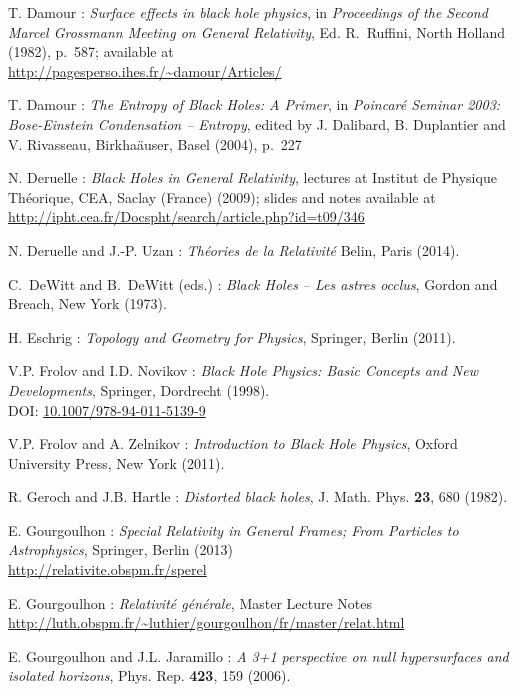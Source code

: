 \begin{thebibliography}{123}
T. Damour : {\em Surface effects in black hole physics},
in {\em Proceedings of the Second Marcel Grossmann Meeting on General
Relativity}, Ed. R.~Ruffini, North Holland (1982), p.~587; available at\\
\url{http://pagesperso.ihes.fr/~damour/Articles/}

T. Damour : {\em The Entropy of Black Holes: A Primer},
in {\em Poincaré Seminar 2003: Bose-Einstein Condensation -- Entropy},
edited by J. Dalibard, B. Duplantier and V. Rivasseau, Birkha\"auser, Basel (2004),
p.~227

N. Deruelle : {\em Black Holes in General Relativity}, lectures at
Institut de Physique Théorique, CEA, Saclay (France) (2009); slides and notes
available at \\
\url{http://ipht.cea.fr/Docspht/search/article.php?id=t09/346}

N. Deruelle and J.-P. Uzan : {\em Th\'eories de la Relativit\'e}
Belin, Paris (2014).

C.~DeWitt and B.~DeWitt (eds.) :
{\em Black Holes -- Les astres occlus},
Gordon and Breach, New York (1973).

H. Eschrig : {\em Topology and Geometry for Physics},
Springer, Berlin (2011).

V.P. Frolov and I.D. Novikov : {\em Black Hole Physics:
Basic Concepts and New Developments},
Springer, Dordrecht (1998). \\
DOI: \href{http://dx.doi.org/doi:10.1007/978-94-011-5139-9}{10.1007/978-94-011-5139-9}

V.P. Frolov and A. Zelnikov : {\em Introduction to Black Hole Physics},
Oxford University Press, New York (2011).

R. Geroch and J.B. Hartle : {\em Distorted black holes},
J. Math. Phys. {\bf 23}, 680 (1982).

E. Gourgoulhon : {\em Special Relativity in General Frames; From Particles to Astrophysics},
Springer, Berlin (2013) \\
\url{http://relativite.obspm.fr/sperel}

E. Gourgoulhon : {\em Relativit\'e g\'en\'erale},
Master Lecture Notes\\
\url{http://luth.obspm.fr/~luthier/gourgoulhon/fr/master/relat.html}

E. Gourgoulhon and J.L. Jaramillo : {\em A 3+1 perspective on null hypersurfaces and isolated horizons},
Phys. Rep. {\bf 423}, 159 (2006).


\end{thebibliography}
